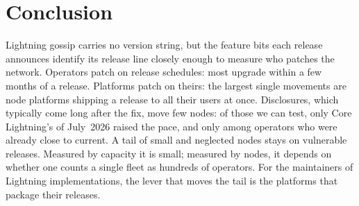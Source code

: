 \section{Conclusion}
\label{sec:conclusion}
Lightning gossip carries no version string, but the feature bits each release announces identify its release line
closely enough to measure who patches the network. Operators patch on release schedules: most upgrade within a few
months of a release. Platforms patch on theirs: the largest single movements are node platforms shipping a release
to all their users at once. Disclosures, which typically come long after the fix, move few nodes: of those we
can test, only Core Lightning's of July~2026 raised the pace, and only among operators who were already close to
current. A tail of small and neglected nodes stays on vulnerable releases. Measured by capacity it is small; measured
by nodes, it depends on whether one counts a single fleet as hundreds of operators. For the maintainers of Lightning
implementations, the lever that moves the tail is the platforms that package their releases.
